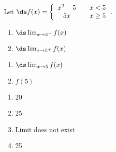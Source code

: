 {Let $\ds f(x)= \left\{\begin{array}{ccc}
x^2-5 & & x<5 \\
5x & & x \geq 5
\end{array}\right.$.

\noindent\begin{minipage}[t]{.49\linewidth}
\begin{enumerate}
\item		$\ds \lim_{x\to 5^-} f(x)$
\item		$\ds \lim_{x\to 5^+} f(x)$
\end{enumerate}
\end{minipage}
\noindent\begin{minipage}[t]{.49\linewidth}
\begin{enumerate}\addtocounter{enumii}{2}
\item		$\ds \lim_{x\to 5} f(x)$
\item		$f(5)$\end{enumerate}
\end{minipage}		
}
{\begin{enumerate}
\item		20
\item		25
\item		Limit does not exist
\item		25
\end{enumerate}
}
